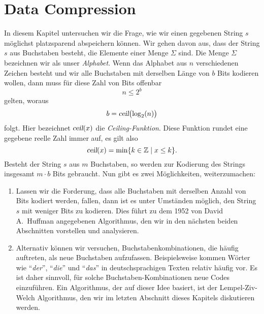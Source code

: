 \chapter{Data Compression}
In diesem Kapitel untersuchen wir die Frage, wie wir einen gegebenen String $s$ m\"oglichst platzsparend
abspeichern k\"onnen.  Wir gehen davon aus, dass der String $s$ aus Buchstaben besteht, die 
Elemente einer Menge $\Sigma$ sind.  Die Menge $\Sigma$ bezeichnen wir als unser \emph{Alphabet}. 
Wenn das Alphabet aus $n$ verschiedenen Zeichen besteht und wir alle Buchstaben mit derselben L\"ange
von $b$ Bits kodieren wollen, dann muss f\"ur diese Zahl von Bits offenbar
\[ n \leq 2^b \] 
gelten, woraus
\[ b = \textsl{ceil}\bigl(\log_2(n)\bigr) \]
folgt.  Hier bezeichnet $\textsl{ceil}(x)$ die \emph{Ceiling-Funktion}.  Diese Funktion
rundet eine gegebene reelle Zahl immer auf, es gilt also
\[ \textsl{ceil}(x) = \min \{ k \in \mathbb{Z} \mid x \leq k \}. \]
Besteht der String $s$ aus $m$ Buchstaben, so werden zur Kodierung des Strings insgesamt
$m \cdot b$ Bits gebraucht.  Nun gibt es zwei M\"oglichkeiten, weiterzumachen:
\begin{enumerate}
\item Lassen wir die Forderung, dass alle Buchstaben mit derselben Anzahl von Bits kodiert werden,
      fallen, dann ist es unter Umst\"anden m\"oglich, den String $s$ mit weniger Bits zu kodieren.  
      Dies f\"uhrt zu dem 1952 von David A.~Huffman angegebenen Algorithmus, den wir in den n\"achsten
      beiden Abschnitten vorstellen und analysieren.
\item Alternativ k\"onnen wir versuchen, Buchstabenkombinationen, die h\"aufig auftreten, als neue
      Buchstaben aufzufassen.  Beispielsweise kommen W\"orter wie ``\emph{der}'', ``\emph{die}'' und
      ``\emph{das}'' in deutschsprachigen Texten relativ h\"aufig vor.  Es ist daher sinnvoll, f\"ur
      solche Buchstaben-Kombinationen neue Codes einzuf\"uhren.  Ein Algorithmus, der auf dieser Idee
      basiert, ist der Lempel-Ziv-Welch Algorithmus, den wir im letzten Abschnitt dieses Kapitels 
      diskutieren werden.
\end{enumerate}


